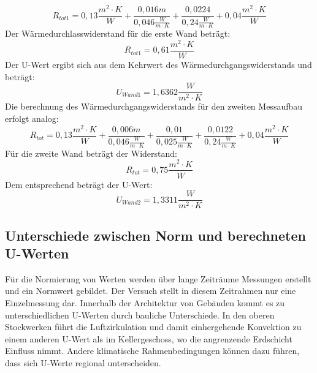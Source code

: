 $$R_{tot1}=0,13 \frac{m^2 \cdot K}{W}+ \frac{0,016m}{0,046 \frac{W}{m \cdot K}}+\frac{0,0224}{0,24 \frac{W}{m \cdot K}} +0,04 \frac{m^2 \cdot K}{W}$$
Der Wärmedurchlasswiderstand für die erste Wand beträgt:
$$R_{tot1}=0,61\frac{m^2 \cdot K}{W}$$
Der U-Wert ergibt sich aus dem Kehrwert des Wärmedurchgangswiderstands und beträgt:
$$U_{Wand 1}=1,6362 \frac{W}{m^2 \cdot K}$$
\newpage
Die berechnung des Wärmedurchgangswiderstands für den zweiten Messaufbau erfolgt analog:
$$R_{tot}=0,13\frac{m^2 \cdot K}{W}+ \frac{0,006m}{0,046\frac{W}{m\cdot K}}+ \frac{0,01}{0,025\frac{W}{m\cdot K}} +\frac{0,0122}{0,24\frac{W}{m\cdot K}} +0,04\frac{m^2 \cdot K}{W}$$
Für die zweite Wand beträgt der Widerstand:
$$R_{tot}=0,75\frac{m^2 \cdot K}{W}$$
Dem entsprechend beträgt der U-Wert:
$$U_{Wand 2}=1,3311 \frac{W}{m^2 \cdot K}$$



\subsection{Unterschiede zwischen Norm und berechneten U-Werten}
Für die Normierung von Werten werden über lange Zeiträume Messungen erstellt und ein Normwert gebildet.
Der Versuch stellt in diesem Zeitrahmen nur eine Einzelmessung dar. 
Innerhalb der Architektur von Gebäuden kommt es zu unterschiedlichen U-Werten durch bauliche Unterschiede.
In den oberen Stockwerken führt die Luftzirkulation und damit einhergehende Konvektion zu einem anderen U-Wert als im Kellergeschoss, wo die angrenzende Erdschicht Einfluss nimmt.
Andere klimatische Rahmenbedingungen können dazu führen, dass sich U-Werte regional unterscheiden. 
